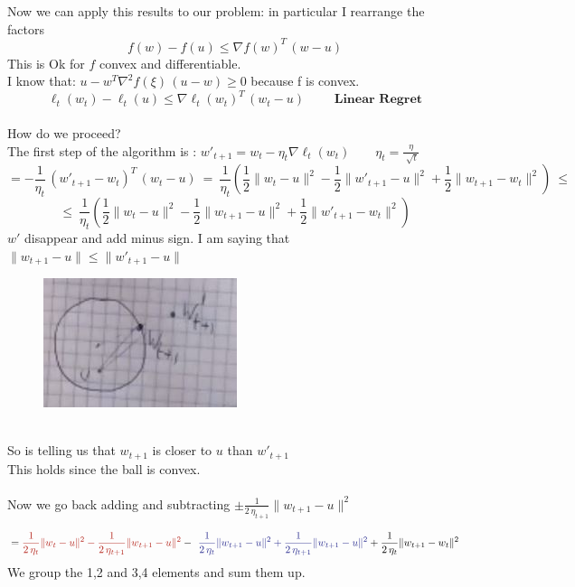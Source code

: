 \documentclass[../main.tex]{subfiles}
\begin{document}
Now we can apply this results to our problem: in particular I rearrange the factors
$$
f(w) - f(u) \leq \nabla f(w)^T \, (w-u)
$$
This is Ok for $f$ convex and differentiable.
\\
I know that: $u-w^T\nabla^2 f(\xi) \, (u-w) \geq 0 $ because f is convex.
\\
$$
\ell_t(w_t) - \ell_t(u) \leq \nabla \ell_t (w_t)^T \, (w_t-u) \qquad \textbf{ Linear Regret}
$$\\
How do we proceed? \\
The first step of the algorithm is : $w'_{t+1} = w_t - \eta_t \nabla \ell_t(w_t) \qquad  \eta_t = \frac{\eta}{\sqrt[]{t}}$
$$
= - \frac{1}{\eta_t} \, (w'_{t+1} - w_t )^T \, (w_t-u) \ = \
 \frac{1}{\eta_t}\left( \frac{1}{2} \| w_t -u \|^2 - \frac{1}{2} \| w'_{t+1} - u \|^2 + \frac{1}{2} \|w_{t+1} - w_t \|^2 \right)  \ \leq
$$
$$
\leq \ 
 \frac{1}{\eta_t}\left( \frac{1}{2} \| w_t -u \|^2 - \frac{1}{2} \| w_{t+1} - u \|^2 + \frac{1}{2} \|w'_{t+1} - w_t \|^2 \right) 
$$
$w'$ disappear and add minus sign. I am saying that $\| w_{t+1} -u \| \leq \| w'_{t+1} - u\|$
\begin{figure}[h]
    \centering
    \includegraphics[width=0.3\linewidth]{../img/lez15-img4.JPG}
    \caption{}
\end{figure}\\
So is telling us that $w_{t+1}$ is closer to $u$ than $w'_{t+1}$
\\This holds since the ball is convex.
\\\\
Now we go back adding and subtracting $\pm \frac{1}{2 \, \eta_{t+1}} \| w_{t+1} -u \|^2$


$$
= \red{\frac{1}{2 \, \eta_t} \| w_t - u\|^2 - 
\frac{1}{2 \, \eta_{t+1}} \| w_{t+1} - u\|^2}
 -
 \blue{ $
 \frac{1}{2 \, \eta_{t}} \|w_{t+1}-u \|^2 
 +
 \frac{1}{2 \, \eta_{t+1}} \|w_{t+1}-u \|^2 $} 
+
\frac{1}{2 \, \eta_{t}} \|w_{t+1}- w_t \|^2 
$$
We group the 1,2 and 3,4 elements and sum them up. \\
\end{document}
